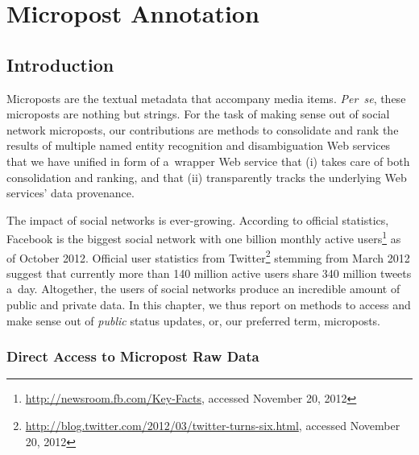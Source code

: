 \chapter{Micropost Annotation}
\label{cha:micropost-annotation}

\ifpdf
    \graphicspath{{4_micropost_annotation/figures/PNG/}{4_micropost_annotation/figures/PDF/}{4_micropost_annotation/figures/}}
\else
    \graphicspath{{4_micropost_annotation/figures/EPS/}{4_micropost_annotation/figures/}}
\fi

\section{Introduction}

Microposts are the textual metadata that accompany media items.
\emph{Per~se}, these microposts are nothing but strings.
For the task of making sense out of social network microposts,
our contributions are methods to consolidate and rank
the results of multiple named entity recognition and
disambiguation Web services that we have unified in form
of a~wrapper Web service that (i) takes care of both
consolidation and ranking, and that
(ii) transparently tracks the underlying Web services'
data provenance.

The impact of social networks is ever-growing.
According to official statistics, Facebook is the biggest
social network with one billion monthly active
users\footnote{\url{http://newsroom.fb.com/Key-Facts},
accessed November 20, 2012}
as of October 2012.
Official user statistics from
Twitter\footnote{\url{http://blog.twitter.com/2012/03/twitter-turns-six.html},
accessed November 20, 2012}
stemming from March 2012 suggest
that currently more than 140 million active users
share 340 million tweets a~day.
Altogether, the users of social networks
produce an incredible amount of public and private data.
In this chapter, we thus report on methods to access and make sense
out of \emph{public} status updates,
or, our preferred term, microposts.

\subsection{Direct Access to Micropost Raw Data}


